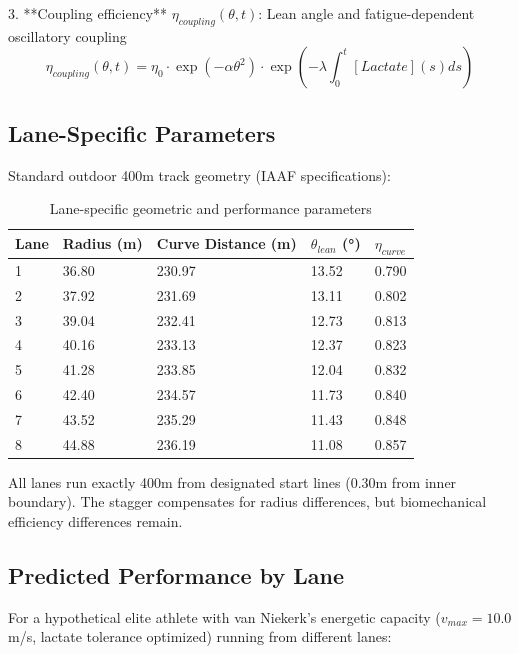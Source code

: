 3. **Coupling efficiency** $\eta_{coupling}(\theta, t)$: Lean angle and fatigue-dependent oscillatory coupling
\begin{equation}
\eta_{coupling}(\theta, t) = \eta_0 \cdot \exp(-\alpha \theta^2) \cdot \exp\left(-\lambda \int_0^t [Lactate](s) ds\right)
\end{equation}

\subsection{Lane-Specific Parameters}

Standard outdoor 400m track geometry (IAAF specifications):

\begin{table}[H]
\centering
\caption{Lane-specific geometric and performance parameters}
\begin{tabular}{@{}lllll@{}}
\toprule
\textbf{Lane} & \textbf{Radius (m)} & \textbf{Curve Distance (m)} & \textbf{$\theta_{lean}$ (°)} & \textbf{$\eta_{curve}$} \\
\midrule
1 & 36.80 & 230.97 & 13.52 & 0.790 \\
2 & 37.92 & 231.69 & 13.11 & 0.802 \\
3 & 39.04 & 232.41 & 12.73 & 0.813 \\
4 & 40.16 & 233.13 & 12.37 & 0.823 \\
5 & 41.28 & 233.85 & 12.04 & 0.832 \\
6 & 42.40 & 234.57 & 11.73 & 0.840 \\
7 & 43.52 & 235.29 & 11.43 & 0.848 \\
8 & 44.88 & 236.19 & 11.08 & 0.857 \\
\bottomrule
\end{tabular}
\end{table}

All lanes run exactly 400m from designated start lines (0.30m from inner boundary). The stagger compensates for radius differences, but biomechanical efficiency differences remain.

\subsection{Predicted Performance by Lane}

For a hypothetical elite athlete with van Niekerk's energetic capacity ($v_{max} = 10.0$ m/s, lactate tolerance optimized) running from different lanes:

